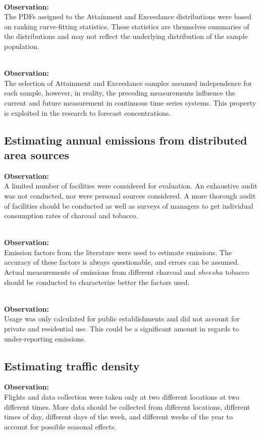 \noindent\\
\textbf{Observation:}\\
The PDFs assigned to the Attainment and Exceedance distributions were based on ranking curve-fitting statistics. These statistics are themselves summaries of the distributions and may not reflect the underlying distribution of the sample population.

\noindent\\
\textbf{Observation:}\\
The selection of Attainment and Exceedance samples assumed independence for each sample, however, in reality, the preceding measurements influence the current and future measurement in continuous time series systems. This property is exploited in the research to forecast concentrations.

\subsection*{Estimating annual emissions from distributed area sources}
\noindent
\textbf{Observation:}\\
A limited number of facilities were considered for evaluation. An exhaustive audit was not conducted, nor were personal sources considered. A more thorough audit of facilities should be conducted as well as surveys of managers to get individual consumption rates of charcoal and tobacco. 

\clearpage

\noindent\\
\textbf{Observation:}\\
Emission factors from the literature were used to estimate emissions. The accuracy of these factors is always questionable, and errors can be assumed. Actual measurements of emissions from different charcoal and $sheesha$ tobacco should be conducted to characterize better the factors used.

\noindent\\
\textbf{Observation:}\\
Usage was only calculated for public establishments and did not account for private and residential use. This could be a significant amount in regards to under-reporting emissions.

\subsection*{Estimating traffic density}
\noindent
\textbf{Observation:}\\
Flights and data collection were taken only at two different locations at two different times. More data should be collected from different locations, different times of day,  different days of the week, and different weeks of the year to account for possible seasonal effects. 

